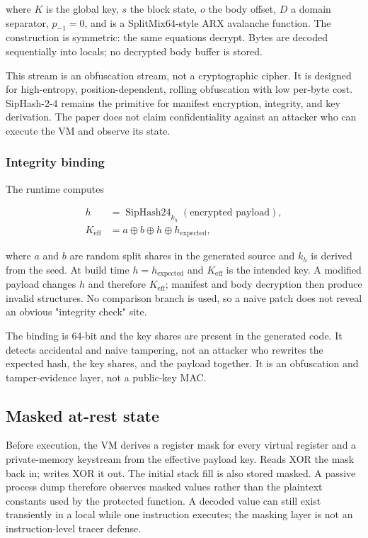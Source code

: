 where $K$ is the global key, $s$ the block state, $o$ the body offset, $D$ a
domain separator, $p_{-1}=0$, and  is a SplitMix64-style ARX avalanche
function. The construction is symmetric: the same equations decrypt. Bytes are
decoded sequentially into locals; no decrypted body buffer is stored.

This stream is an obfuscation stream, not a cryptographic cipher. It is designed
for high-entropy, position-dependent, rolling obfuscation with low per-byte cost.
SipHash-2-4 remains the primitive for manifest encryption, integrity, and key
derivation. The paper does not claim confidentiality against an attacker who can
execute the VM and observe its state.

\subsubsection{Integrity binding}

The runtime computes

\begin{align}
  h &= \operatorname{SipHash24}_{k_h}(\text{encrypted payload}), \label{eq:hash}\\
  K_{\text{eff}} &= a \oplus b \oplus h \oplus h_{\text{expected}}, \label{eq:key}
\end{align}

where $a$ and $b$ are random split shares in the generated source and $k_h$ is
derived from the seed. At build time $h = h_{\text{expected}}$ and
$K_{\text{eff}}$ is the intended key. A modified payload changes $h$ and therefore
$K_{\text{eff}}$; manifest and body decryption then produce invalid structures.
No comparison branch is used, so a naive patch does not reveal an obvious
"integrity check" site.

The binding is 64-bit and the key shares are present in the generated code. It
detects accidental and naive tampering, not an attacker who rewrites the expected
hash, the key shares, and the payload together. It is an obfuscation and
tamper-evidence layer, not a public-key MAC.

\subsection{Masked at-rest state}

Before execution, the VM derives a register mask for every virtual register and a
private-memory keystream from the effective payload key. Reads XOR the mask back
in; writes XOR it out. The initial stack fill is also stored masked. A passive
process dump therefore observes masked values rather than the plaintext
constants used by the protected function. A decoded value can still exist
transiently in a local while one instruction executes; the masking layer is not
an instruction-level tracer defense.

